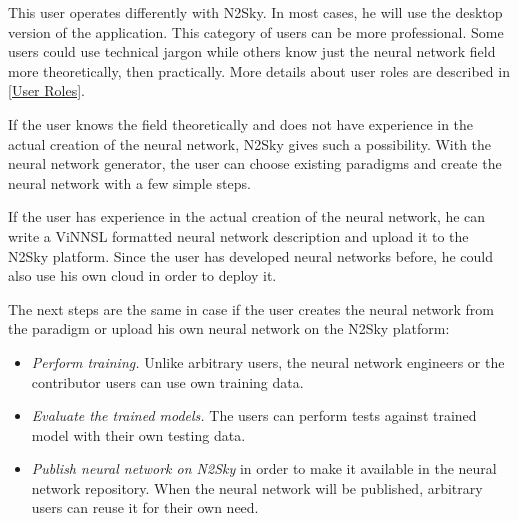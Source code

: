 This user operates differently with N2Sky. In most cases, he will use the desktop version of the application. 
This category of users can be more professional. Some users could use technical jargon while others know just the neural network field more theoretically, then practically. More details about user roles are described in \autoref{User Roles}. 

If the user knows the field theoretically and does not have experience in the actual creation of the neural network, N2Sky gives such a possibility. With the neural network generator, the user can choose existing paradigms and create the neural network with a few simple steps. 

If the user has experience in the actual creation of the neural network, he can write a ViNNSL formatted neural network description and upload it to the N2Sky platform. Since the user has developed neural networks before, he could also use his own cloud in order to deploy it. 

The next steps are the same in case if the user creates the neural network from the paradigm or upload his own neural network on the N2Sky platform:

\begin{itemize}
\item \emph{Perform training.}  Unlike arbitrary users, the neural network engineers or the contributor users can use own training data. 
\item \emph{Evaluate the trained models.} The users can perform tests against trained model with their own testing data.
\item \emph{Publish neural network on N2Sky} in order to make it available in the neural network repository. When the neural network will be published, arbitrary users can reuse it for their own need. 
\end{itemize}


